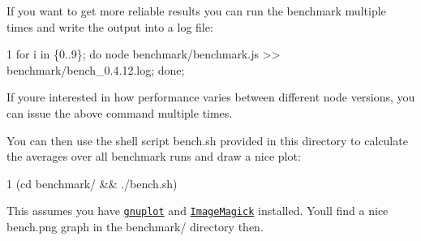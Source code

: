 If you want to get more reliable results you can run the benchmark multiple times and write the output into a log file\+:


\begin{DoxyCode}
1 for i in \{0..9\}; do node benchmark/benchmark.js >> benchmark/bench\_0.4.12.log; done;
\end{DoxyCode}


If you\textquotesingle{}re interested in how performance varies between different node versions, you can issue the above command multiple times.

You can then use the shell script {\ttfamily bench.\+sh} provided in this directory to calculate the averages over all benchmark runs and draw a nice plot\+:


\begin{DoxyCode}
1 (cd benchmark/ && ./bench.sh)
\end{DoxyCode}


This assumes you have \href{http://www.gnuplot.info/}{\tt gnuplot} and \href{http://www.imagemagick.org/}{\tt Image\+Magick} installed. You\textquotesingle{}ll find a nice {\ttfamily bench.\+png} graph in the {\ttfamily benchmark/} directory then. 